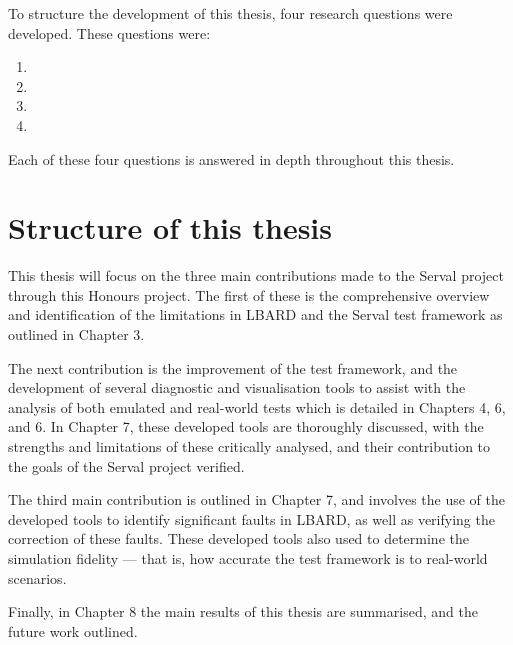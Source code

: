 To structure the development of this thesis, four research questions were developed.
These questions were:
\begin{enumerate}
    \item \firstRQ
    \item \secondRQ
    \item \thirdRQ
    \item \fourthRQ
\end{enumerate}
Each of these four questions is answered in depth throughout this thesis.


\section{Structure of this thesis}

This thesis will focus on the three main contributions made to the Serval project through this Honours project.
The first of these is the comprehensive overview and identification of the limitations in LBARD and the Serval test framework as outlined in Chapter 3.

The next contribution is the improvement of the test framework, and the development of several diagnostic and visualisation tools to assist with the analysis of both emulated and real-world tests which is detailed in Chapters 4, 6, and 6. 
In Chapter 7, these developed tools are thoroughly discussed, with the strengths and limitations of these critically analysed, and their contribution to the goals of the Serval project verified. 

The third main contribution is outlined in Chapter 7, and involves the use of the developed tools to identify significant faults in LBARD, as well as verifying the correction of these faults.
These developed tools also used to determine the simulation fidelity — that is, how accurate the test framework is to real-world scenarios.

Finally, in Chapter 8 the main results of this thesis are summarised, and the future work outlined.


